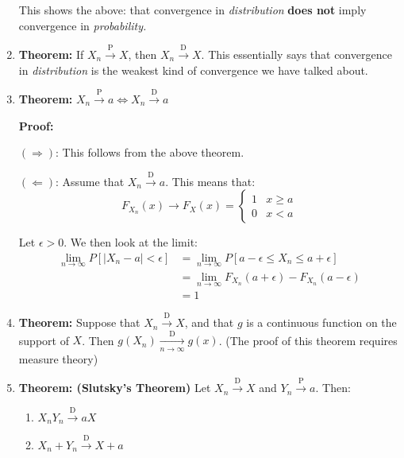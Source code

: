 \documentclass{article}
\begin{document}
\begin{enumerate}
    This shows the above: that convergence in \textit{distribution} \textbf{does not} imply convergence in \textit{probability.}
    
    \item \textbf{Theorem: }If $X_n \xrightarrow{\text{P}} X$, then $X_n \xrightarrow{\text{D}} X$. This essentially says that convergence in \textit{distribution} is the weakest kind of convergence we have talked about.
    
    \item \textbf{Theorem:} $X_n \xrightarrow{\text{P}} a \iff X_n \xrightarrow{\text{D}} a$
    
    \textbf{Proof:} 
    
    $(\Rightarrow)$: This follows from the above theorem. 
    
    $(\Leftarrow)$: Assume that $X_n \xrightarrow{\text{D}} a$. This means that:
    \begin{equation*}
        F_{X_n}(x) \rightarrow F_X(x) = \begin{cases}
            1 & x \geq a\\
            0 & x < a
        \end{cases}
    \end{equation*}
    
    Let $\epsilon>0$. We then look at the limit:
    \begin{equation*}
    \begin{split}
        \lim_{n\to\infty} P\left[|X_n - a| < \epsilon \right] &=\lim_{n\to\infty} P\left[a-\epsilon \leq X_n \leq a + \epsilon \right]\\
        &=\lim_{n\to\infty} F_{X_n}(a+\epsilon) - F_{X_n}(a-\epsilon)\\
        &= 1
    \end{split}
    \end{equation*}
    
    \item \textbf{Theorem:} Suppose that $X_n \xrightarrow{\text{D}} X$, and that $g$ is a continuous function on the support of $X$. Then $g\left(X_n\right) \xrightarrow[n \to \infty]{\text{D}} g(x)$. (The proof of this theorem requires measure theory)
    
    \item \textbf{Theorem: (Slutsky's Theorem)} Let $X_n \xrightarrow{\text{D}} X$ and $Y_n \xrightarrow{\text{P}} a$. Then:
    \begin{enumerate}
        \item $X_n Y_n \xrightarrow{\text{D}} aX$
        \item $X_n + Y_n \xrightarrow{\text{D}} X + a$
    \end{enumerate}
    

\end{enumerate}
\end{document}
